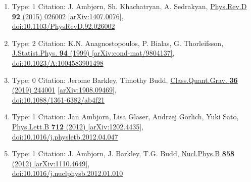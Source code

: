 \documentclass[a4paper,10pt]{article}
\begin{document}
\begin{enumerate}
\begin{enumerate}
  \item Type: 1 Citation: J. Ambjørn, Sh. Khachatryan, A. Sedrakyan, \href{https://www.doi.org/10.1103/PhysRevD.92.026002}{Phys.Rev.D {\bf 92} (2015) 026002}  \href{https://arxiv.org/abs/1407.0076}{[arXiv:1407.0076]},\\\href{https://www.doi.org/10.1103/PhysRevD.92.026002}{doi:10.1103/PhysRevD.92.026002}
  \item Type: 2 Citation: K.N. Anagnostopoulos, P. Bialas, G. Thorleifsson, \href{https://www.doi.org/10.1023/A:1004583901498}{J.Statist.Phys. {\bf 94} (1999) }  \href{https://arxiv.org/abs/cond-mat/9804137}{[arXiv:cond-mat/9804137]},\\\href{https://www.doi.org/10.1023/A:1004583901498}{doi:10.1023/A:1004583901498}
  \item Type: 0 Citation: Jerome Barkley, Timothy Budd, \href{https://www.doi.org/10.1088/1361-6382/ab4f21}{Class.Quant.Grav. {\bf 36} (2019) 244001}  \href{https://arxiv.org/abs/1908.09469}{[arXiv:1908.09469]},\\\href{https://www.doi.org/10.1088/1361-6382/ab4f21}{doi:10.1088/1361-6382/ab4f21}
  \item Type: 1 Citation: Jan Ambjorn, Lisa Glaser, Andrzej Gorlich, Yuki Sato, \href{https://www.doi.org/10.1016/j.physletb.2012.04.047}{Phys.Lett.B {\bf 712} (2012) }  \href{https://arxiv.org/abs/1202.4435}{[arXiv:1202.4435]},\\\href{https://www.doi.org/10.1016/j.physletb.2012.04.047}{doi:10.1016/j.physletb.2012.04.047}
  \item Type: 1 Citation: J. Ambjorn, J. Barkley, T.G. Budd, \href{https://www.doi.org/10.1016/j.nuclphysb.2012.01.010}{Nucl.Phys.B {\bf 858} (2012) }  \href{https://arxiv.org/abs/1110.4649}{[arXiv:1110.4649]},\\\href{https://www.doi.org/10.1016/j.nuclphysb.2012.01.010}{doi:10.1016/j.nuclphysb.2012.01.010}

\end{enumerate}
\end{enumerate}
\end{document}
